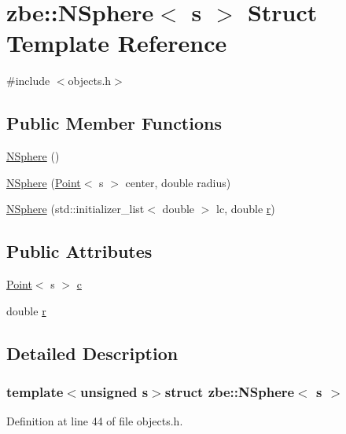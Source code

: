 \hypertarget{structzbe_1_1_n_sphere}{}\section{zbe\+:\+:N\+Sphere$<$ s $>$ Struct Template Reference}
\label{structzbe_1_1_n_sphere}


{\ttfamily \#include $<$objects.\+h$>$}

\subsection*{Public Member Functions}
\begin{DoxyCompactItemize}
\item 
\hyperlink{structzbe_1_1_n_sphere_a51470e4b5458d4fca454de310cff1bd6}{N\+Sphere} ()
\item 
\hyperlink{structzbe_1_1_n_sphere_af4863ac7a99086b089328b590fb65eb6}{N\+Sphere} (\hyperlink{classzbe_1_1_point}{Point}$<$ s $>$ center, double radius)
\item 
\hyperlink{structzbe_1_1_n_sphere_afcecbe0890ba0e723bbd092e0e598f80}{N\+Sphere} (std\+::initializer\+\_\+list$<$ double $>$ lc, double \hyperlink{structzbe_1_1_n_sphere_ac8fae694bd80717eec61699b4d5206c6}{r})
\end{DoxyCompactItemize}
\subsection*{Public Attributes}
\begin{DoxyCompactItemize}
\item 
\hyperlink{classzbe_1_1_point}{Point}$<$ s $>$ \hyperlink{structzbe_1_1_n_sphere_a4e3c36d361b729674a9e62e37824339e}{c}
\item 
double \hyperlink{structzbe_1_1_n_sphere_ac8fae694bd80717eec61699b4d5206c6}{r}
\end{DoxyCompactItemize}


\subsection{Detailed Description}
\subsubsection*{template$<$unsigned s$>$struct zbe\+::\+N\+Sphere$<$ s $>$}



Definition at line 44 of file objects.\+h.



